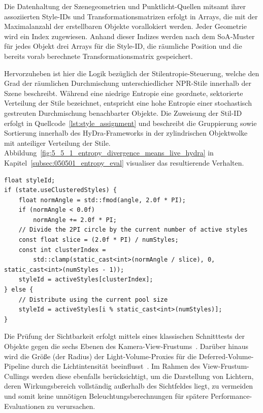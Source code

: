 Die Datenhaltung der Szenegeometrien und Punktlicht-Quellen mitsamt ihrer assoziierten Style-IDs und
Transformationsmatrizen erfolgt in Arrays, die mit der Maximalanzahl der erstellbaren Objekte vorallokiert werden.
Jeder Geometrie wird ein Index zugewiesen.
Anhand dieser Indizes werden nach dem \ac{SoA}-Muster~\parencite[vgl.][S.~793]{akenine-mollerRealtimeRendering2019} für jedes
Objekt drei Arrays für die Style-ID, die räumliche Position und die bereits vorab berechnete
Transformationsmatrix gespeichert.

Hervorzuheben ist hier die Logik bezüglich der Stilentropie-Steuerung, welche den Grad der räumlichen
Durchmischung unterschiedlicher \ac{NPR}-Stile innerhalb der Szene beschreibt.
Während eine niedrige Entropie eine geordnete, sektorierte Verteilung der Stile bezeichnet, entspricht eine hohe
Entropie einer stochastisch gestreuten Durchmischung benachbarter Objekte.
Die Zuweisung der Stil-ID erfolgt in Quellcode~\ref{lst:style_assignment} und beschreibt die Gruppierung sowie
Sortierung innerhalb des \ac{HyDra}-Frameworks in der zylindrischen Objektwolke mit anteiliger Verteilung der Stile.
Abbildung~\ref{fig:5_5_1_entropy_divergence_means_live_hydra} in Kapitel~\ref{subsec:050501_entropy_eval} visualiser das
resultierende Verhalten.

\begin{listing}[htbp]
    \begin{codeframe}
        \begin{verbatim}
float styleId;
if (state.useClusteredStyles) {
    float normAngle = std::fmod(angle, 2.0f * PI);
    if (normAngle < 0.0f)
        normAngle += 2.0f * PI;
    // Divide the 2PI circle by the current number of active styles
    const float slice = (2.0f * PI) / numStyles;
    const int clusterIndex =
        std::clamp(static_cast<int>(normAngle / slice), 0, static_cast<int>(numStyles - 1));
    styleId = activeStyles[clusterIndex];
} else {
    // Distribute using the current pool size
    styleId = activeStyles[i % static_cast<int>(numStyles)];
}
        \end{verbatim}
    \end{codeframe}
    \caption[C++ Code zur Berechnung der Style-ID-Verteilung im HyDra-Framework]{C++ Code zur Berechnung der
    \texttt{styleId}-Verteilung basierend auf dem Cluster-Status im
    HyDra-Framework.}
    \label{lst:style_assignment}
\end{listing}

Die Prüfung der Sichtbarkeit erfolgt mittels eines klassischen Schnitttests der Objekte gegen die sechs Ebenen
des Kamera-View-Frustums~\parencite[vgl.][S.~688, Abschn. \textit{Frustum Culling}]{gregoryGameEngineArchitecture2018}.
Darüber hinaus wird die Größe (der Radius) der Light-Volume-Proxies für die Deferred-Volume-Pipeline durch die
Lichtintensität beeinflusst~\parencite[vgl.][S.~891]{akenine-mollerRealtimeRendering2019}.
Im Rahmen des View-Frustum-Cullings werden diese ebenfalls berücksichtigt, um die Darstellung von Lichtern, deren
Wirkungsbereich vollständig außerhalb des Sichtfeldes liegt, zu vermeiden und somit keine unnötigen
Beleuchtungsberechnungen für spätere Performance-Evaluationen zu verursachen.

